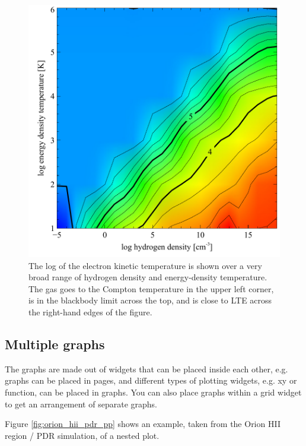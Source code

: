 \begin{figure}
\begin{center}
\includegraphics[clip=on,width=0.7\columnwidth,height=0.7\textheight,keepaspectratio]{grid_extreme}
\end{center}
\caption{The log of the electron kinetic temperature is shown 
over a very broad range of hydrogen density 
and energy-density temperature.  The gas goes to the Compton temperature in the 
upper left corner, is in the blackbody limit across the top, and is close to LTE 
across the right-hand edges of the figure.}
\label{fig:grid_extreme}
\end{figure}

\subsection{Multiple graphs}

The graphs are made out of widgets that can be placed inside each other, e.g. 
graphs can be placed in pages, and different types of plotting widgets, e.g. xy or function, 
can be placed in graphs. 
You can also place graphs within a grid widget to get an arrangement of separate graphs.

Figure \ref{fig:orion_hii_pdr_pp} shows an example, 
taken from the Orion HII region / PDR simulation, of a nested plot.

